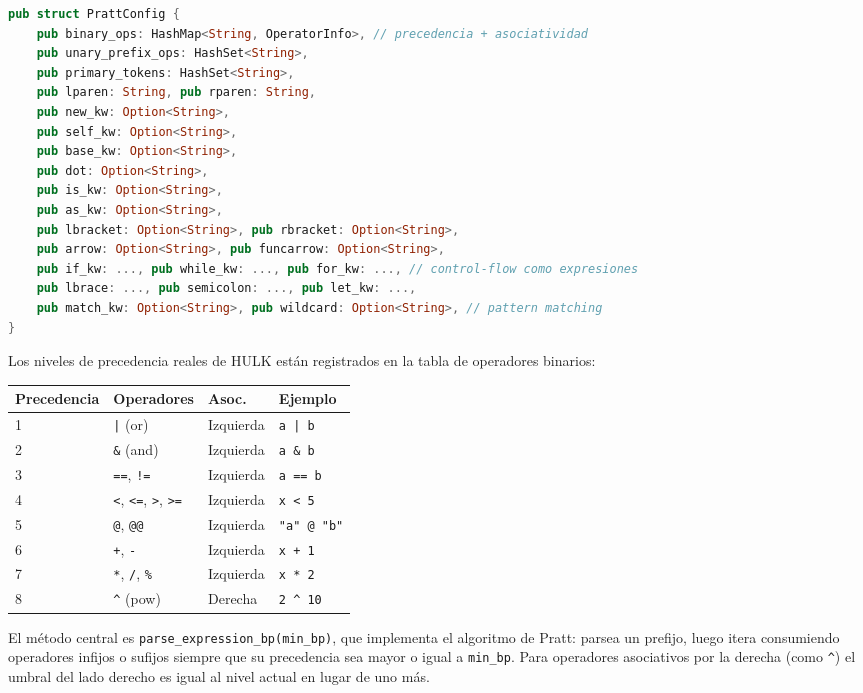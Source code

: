 \documentclass[12pt,letterpaper]{article}
\newcommand{\hulk}{\textsc{HULK}}
\newcommand{\src}[1]{\texttt{#1}}
\begin{document}
\begin{lstlisting}[language=Rust,caption={Configuración del Pratt parser}]
pub struct PrattConfig {
    pub binary_ops: HashMap<String, OperatorInfo>, // precedencia + asociatividad
    pub unary_prefix_ops: HashSet<String>,
    pub primary_tokens: HashSet<String>,
    pub lparen: String, pub rparen: String,
    pub new_kw: Option<String>,
    pub self_kw: Option<String>,
    pub base_kw: Option<String>,
    pub dot: Option<String>,
    pub is_kw: Option<String>,
    pub as_kw: Option<String>,
    pub lbracket: Option<String>, pub rbracket: Option<String>,
    pub arrow: Option<String>, pub funcarrow: Option<String>,
    pub if_kw: ..., pub while_kw: ..., pub for_kw: ..., // control-flow como expresiones
    pub lbrace: ..., pub semicolon: ..., pub let_kw: ...,
    pub match_kw: Option<String>, pub wildcard: Option<String>, // pattern matching
}
\end{lstlisting}

Los niveles de precedencia reales de \hulk{} están registrados en la tabla de operadores binarios:

\begin{longtable}{p{3cm}p{3.5cm}p{2cm}p{5.5cm}}
\toprule
\textbf{Precedencia} & \textbf{Operadores} & \textbf{Asoc.} & \textbf{Ejemplo} \\
\midrule
1 & \src{|} (or) & Izquierda & \src{a | b} \\
2 & \src{\&} (and) & Izquierda & \src{a \& b} \\
3 & \src{==}, \src{!=} & Izquierda & \src{a == b} \\
4 & \src{<}, \src{<=}, \src{>}, \src{>=} & Izquierda & \src{x < 5} \\
5 & \src{@}, \src{@@} & Izquierda & \src{"a" @ "b"} \\
6 & \src{+}, \src{-} & Izquierda & \src{x + 1} \\
7 & \src{*}, \src{/}, \src{\%} & Izquierda & \src{x * 2} \\
8 & \texttt{\textasciicircum} (pow) & Derecha & \texttt{2 \textasciicircum{} 10} \\
\bottomrule
\end{longtable}

El método central es \src{parse\_expression\_bp(min\_bp)}, que implementa el algoritmo de Pratt: parsea un prefijo, luego itera consumiendo operadores infijos o sufijos siempre que su precedencia sea mayor o igual a \src{min\_bp}. Para operadores asociativos por la derecha (como \texttt{\textasciicircum}) el umbral del lado derecho es igual al nivel actual en lugar de uno más.
\end{document}
